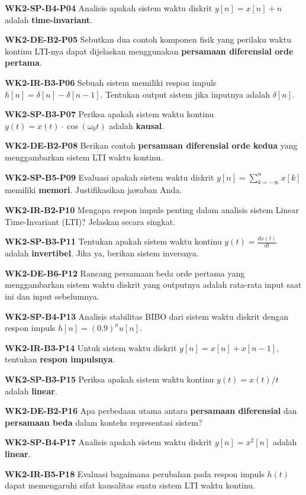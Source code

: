 \documentclass[
  letterpaper,
  DIV=11,
  numbers=noendperiod]{scrreprt}
\begin{document}
\textbf{WK2-SP-B4-P04} Analisis apakah sistem waktu diskrit
\(y[n] = x[n] + n\) adalah \textbf{time-invariant}.

\textbf{WK2-DE-B2-P05} Sebutkan dua contoh komponen fisik yang perilaku
waktu kontinu LTI-nya dapat dijelaskan menggunakan \textbf{persamaan
diferensial orde pertama}.

\textbf{WK2-IR-B3-P06} Sebuah sistem memiliki respon impuls
\(h[n] = \delta[n] - \delta[n-1]\). Tentukan output sistem jika inputnya
adalah \(\delta[n]\).

\textbf{WK2-SP-B3-P07} Periksa apakah sistem waktu kontinu
\(y(t) = x(t) \cdot \cos(\omega_0 t)\) adalah \textbf{kausal}.

\textbf{WK2-DE-B2-P08} Berikan contoh \textbf{persamaan diferensial orde
kedua} yang menggambarkan sistem LTI waktu kontinu.

\textbf{WK2-SP-B5-P09} Evaluasi apakah sistem waktu diskrit
\(y[n] = \sum_{k=-\infty}^{n} x[k]\) memiliki \textbf{memori}.
Justifikasikan jawaban Anda.

\textbf{WK2-IR-B2-P10} Mengapa respon impuls penting dalam analisis
sistem Linear Time-Invariant (LTI)? Jelaskan secara singkat.

\textbf{WK2-SP-B3-P11} Tentukan apakah sistem waktu kontinu
\(y(t) = \frac{dx(t)}{dt}\) adalah \textbf{invertibel}. Jika ya, berikan
sistem inversnya.

\textbf{WK2-DE-B6-P12} Rancang persamaan beda orde pertama yang
menggambarkan sistem waktu diskrit yang outputnya adalah rata-rata input
saat ini dan input sebelumnya.

\textbf{WK2-SP-B4-P13} Analisis stabilitas BIBO dari sistem waktu
diskrit dengan respon impuls \(h[n] = (0.9)^n u[n]\).

\textbf{WK2-IR-B3-P14} Untuk sistem waktu diskrit
\(y[n] = x[n] + x[n-1]\), tentukan \textbf{respon impulsnya}.

\textbf{WK2-SP-B3-P15} Periksa apakah sistem waktu kontinu
\(y(t) = x(t)/t\) adalah \textbf{linear}.

\textbf{WK2-DE-B2-P16} Apa perbedaan utama antara \textbf{persamaan
diferensial} dan \textbf{persamaan beda} dalam konteks representasi
sistem?

\textbf{WK2-SP-B4-P17} Analisis apakah sistem waktu diskrit
\(y[n] = x^2[n]\) adalah \textbf{linear}.

\textbf{WK2-IR-B5-P18} Evaluasi bagaimana perubahan pada respon impuls
\(h(t)\) dapat memengaruhi sifat kausalitas suatu sistem LTI waktu
kontinu.
\end{document}
